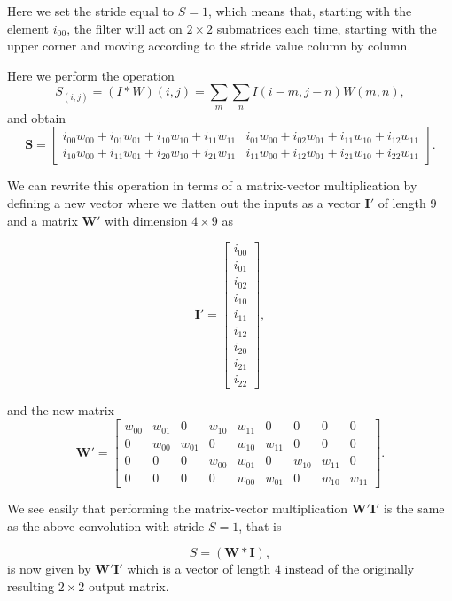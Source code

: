 \documentclass[%
oneside,                 %
final,                   %
10pt]{article}
\begin{document}
Here we set the stride equal to $S=1$, which means that, starting with the element $i_{00}$, the filter will act on $2\times 2$ submatrices each time, starting with the upper corner and moving according to the stride value column by column. 

Here we perform the operation
\[
S_(i,j)=(I * W)(i,j) = \sum_m\sum_n I(i-m,j-n)W(m,n),
\]
and obtain
\[
\bm{S}=\begin{bmatrix}i_{00}w_{00}+i_{01}w_{01}+i_{10}w_{10}+i_{11}w_{11} & i_{01}w_{00}+i_{02}w_{01}+i_{11}w_{10}+i_{12}w_{11}  \\
	              i_{10}w_{00}+i_{11}w_{01}+i_{20}w_{10}+i_{21}w_{11} & i_{11}w_{00}+i_{12}w_{01}+i_{21}w_{10}+i_{22}w_{11}\end{bmatrix}.
\]

We can rewrite this operation in terms of a matrix-vector multiplication by defining a new vector where we flatten out the inputs as a vector $\bm{I}'$ of length $9$ and
a matrix $\bm{W}'$ with dimension $4\times 9$ as

\[
\bm{I}'=\begin{bmatrix}i_{00} \\ i_{01} \\ i_{02} \\ i_{10} \\ i_{11} \\ i_{12} \\ i_{20} \\ i_{21} \\ i_{22} \end{bmatrix},
\]

and the new matrix
\[
\bm{W}'=\begin{bmatrix} w_{00} & w_{01} & 0 & w_{10} & w_{11} & 0 & 0 & 0 & 0 \\
                        0  & w_{00} & w_{01} & 0 & w_{10} & w_{11} & 0 & 0 & 0 \\
			0 & 0 & 0 & w_{00} & w_{01} & 0 & w_{10} & w_{11} & 0  \\
                        0 & 0 & 0 & 0 & w_{00} & w_{01} & 0 & w_{10} & w_{11}\end{bmatrix}.
\]

We see easily that performing the matrix-vector multiplication $\bm{W}'\bm{I}'$ is the same as the above convolution with stride $S=1$, that is

\[
S=(\bm{W}*\bm{I}),
\]
is now given by $\bm{W}'\bm{I}'$ which is a vector of length $4$ instead of the originally resulting  $2\times 2$ output matrix.
\end{document}
